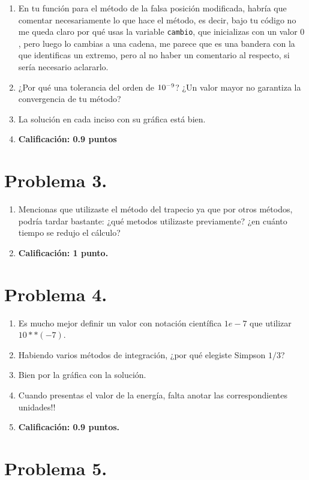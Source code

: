 \begin{enumerate}
\item En tu función para el método de la falsa posición modificada, habría que comentar necesariamente lo que hace el método, es decir, bajo tu código no me queda claro por qué usas la variable \texttt{cambio}, que inicializas con un valor $0$, pero luego lo cambias a una cadena, me parece que es una bandera con la que identificas un extremo, pero al no haber un comentario al respecto, si sería necesario aclararlo.
\item ¿Por qué una tolerancia del orden de $\num{d-9}$? ¿Un valor mayor no garantiza la convergencia de tu método?
\item La solución en cada inciso con su gráfica está bien.
\item \textbf{Calificación: 0.9 puntos}
\end{enumerate}

\section{Problema 3.}

\begin{enumerate}
\item Mencionas que utilizaste el método del trapecio ya que por otros métodos, podría tardar bastante: ¿qué metodos utilizaste previamente? ¿en cuánto tiempo se redujo el cálculo?
\item \textbf{Calificación: 1 punto.}
\end{enumerate}

\section{Problema 4.}

\begin{enumerate}
\item Es mucho mejor definir un valor con notación científica $1e-7$ que utilizar $10**(-7)$.
\item Habiendo varios métodos de integración, ¿por qué elegiste Simpson $1/3$?
\item Bien por la gráfica con la solución.
\item Cuando presentas el valor de la energía, falta anotar las correspondientes unidades!!
\item \textbf{Calificación: 0.9 puntos.}
\end{enumerate}

\section{Problema 5.}

